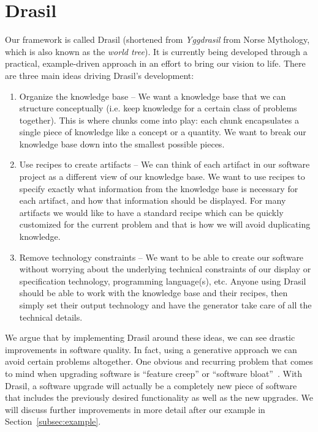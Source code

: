 \documentclass[preprint, 10pt]{sigplanconf}
\begin{document}
\section{Drasil}
\label{sec:Drasil}

Our framework is called Drasil (shortened from \emph{Yggdrasil} from Norse
Mythology, which is also known as the \emph{world tree}). It is currently being
developed through a practical, example-driven approach in an effort to bring our
vision to life. There are three main ideas driving Drasil's development:

\begin{enumerate}
\item Organize the knowledge base -- We want a knowledge base that we can
structure conceptually (i.e. keep knowledge for a certain class of problems
together). This is where chunks come into play: each chunk encapsulates a single
piece of knowledge like a concept or a quantity. We want to break our knowledge
base down into the smallest possible pieces.

\item Use recipes to create artifacts -- We can think of each artifact in our
software project as a different view of our knowledge base. We want to use
recipes to specify exactly what information from the knowledge base is necessary
for each artifact, and how that information should be displayed. For many
artifacts we would like to have a standard recipe which can be quickly
customized for the current problem and that is how we will avoid duplicating
knowledge.

\item Remove technology constraints -- We want to be able to create our software
without worrying about the underlying technical constraints of our display or
specification technology, programming language(s), etc. Anyone using Drasil
should be able to work with the knowledge base and their recipes, then simply
set their output technology and have the generator take care of all the
technical details.
\end{enumerate}

We argue that by implementing Drasil around these ideas, we can see drastic
improvements in software quality. In fact, using a generative approach we can
avoid certain problems altogether. One obvious and recurring problem that comes
to mind when upgrading software is ``feature creep'' or ``software
bloat''~\cite{AmselEtAl2011}. With Drasil, a software upgrade will actually be a
completely new piece of software that includes the previously desired
functionality as well as the new upgrades. We will discuss further improvements
in more detail after our example in Section~\ref{subsec:example}.
\end{document}
